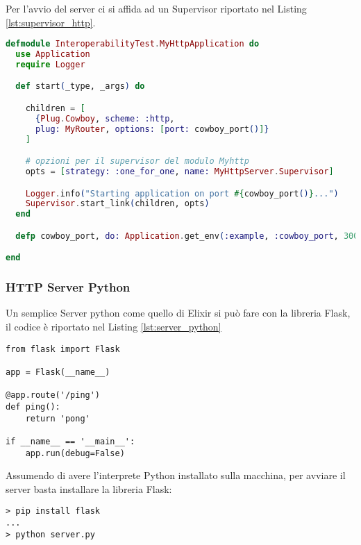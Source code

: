 Per l'avvio del server ci si affida ad un Supervisor
riportato nel Listing \ref{lst:supervisor_http}.

\begin{lstlisting}[language=elixir, caption={Supervisor dell'applicazione HTTP},
	captionpos=b,label={lst:supervisor_http}]
defmodule InteroperabilityTest.MyHttpApplication do
  use Application
  require Logger

  def start(_type, _args) do

    children = [
      {Plug.Cowboy, scheme: :http,
	  plug: MyRouter, options: [port: cowboy_port()]}
    ]

    # opzioni per il supervisor del modulo Myhttp
    opts = [strategy: :one_for_one, name: MyHttpServer.Supervisor]

    Logger.info("Starting application on port #{cowboy_port()}...")
    Supervisor.start_link(children, opts)
  end

  defp cowboy_port, do: Application.get_env(:example, :cowboy_port, 3000)

end
\end{lstlisting}

\subsubsection{HTTP Server Python}

Un semplice Server python come quello di Elixir si può fare con
la libreria Flask, il codice è riportato nel Listing \ref{lst:server_python}

\begin{lstlisting}[language=ipython, caption={Server Python(Flask)},
	captionpos=b,label={lst:server_python}]
from flask import Flask

app = Flask(__name__)
	
@app.route('/ping')
def ping():
    return 'pong'
	
if __name__ == '__main__':
    app.run(debug=False)

\end{lstlisting}

Assumendo di avere l'interprete Python
installato sulla macchina, per
avviare il server basta installare la libreria Flask:

\begin{lstlisting}[language=none]
> pip install flask
...
> python server.py
\end{lstlisting}


